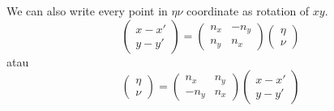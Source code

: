 \documentclass[a4paper,12pt]{article}
\begin{document}
We can also write every point in  $\eta\nu$ coordinate as rotation of $xy$.
\begin{equation}
\left(\begin{array}{c}
      x-x' \\
      y-y'
    \end{array}\right)=\left(\begin{array}{cc}
      n_x & -n_y \\
      n_y & n_x
    \end{array}\right)\left(\begin{array}{c}
      \eta\\
      \nu
    \end{array}\right) \label{RotasixNu}
\end{equation}
atau
\begin{equation}
\left(\begin{array}{c}
    \eta   \\
     \nu 
    \end{array}\right)=\left(\begin{array}{cc}
      n_x & n_y \\
      -n_y & n_x
    \end{array}\right)\left(\begin{array}{c}
      x-x'\\
     y-y'
    \end{array}\right) 
\end{equation}
\end{document}

